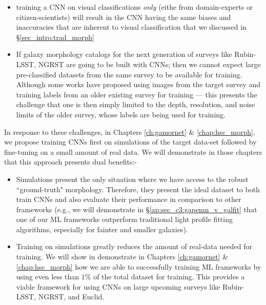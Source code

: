 \begin{itemize}
    \item training a CNN on visual classifications \textit{only} (eithe from domain-experts or citizen-scientists) will result in the CNN having the same biases and inaccuracies that are inherent to visual classification that we discussed in \S \ref{sec_intro:trad_morph}
    \item If galaxy morphology catalogs for the next generation of surveys like Rubin-LSST, NGRST are going to be built with CNNs; then we cannot expect large pre-classified datasets from the same survey to be available  for training. Although some works \citep[e.g.,][]{Cheng2021GalaxyNetworks} have proposed using images from the target survey and training labels from an older existing survey for training --- this presents the challenge that one is then simply limited to the depth, resolution, and noise limits of the older survey, whose labels are being used for training. 
\end{itemize}

In response to these challenges, in Chapters \ref{ch:gamornet} \& \ref{chap:hsc_morph}, we propose training CNNs first on simulations of the target data-set followed by fine-tuning on a small amount of real data. We will demonstrate in those chapters that this approach presents dual benefits:- 
\begin{itemize}
    \item Simulations present the only situation where we have access to the robust ``ground-truth" morphology. Therefore, they present the ideal dataset to both train CNNs and also evaluate their performance in comparison to other frameworks (e.g., we will demonstrate in \S \ref{ap:sec_c3:gapemn_v_galfit} that one of our ML frameworks outperform traditional light profile fitting algorithms, especially for fainter and smaller galaxies).
    \item Training on simulations greatly reduces the amount of real-data needed for training. We will show in demonstrate in Chapters \ref{ch:gamornet} \& \ref{chap:hsc_morph} how we are able to successfully training ML frameworks by using even less than $1\%$ of the total dataset for training. This provides a viable framework for using CNNs on large upcoming surveys like Rubin-LSST, NGRST, and Euclid.
\end{itemize}



